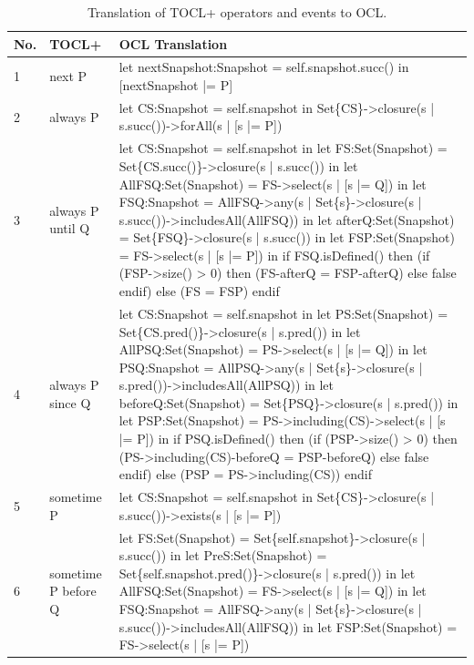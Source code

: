 \begin{longtable}{|>{\footnotesize}p{0.6cm}|>{\scriptsize\raggedright\arraybackslash}p{4cm}|>{\scriptsize\raggedright\arraybackslash}p{\dimexpr\textwidth-4.6cm-4\tabcolsep-3\arrayrulewidth\relax}|}
    \caption{Translation of TOCL+ operators and events to OCL.}
    \label{tab:TOCL2OCL} \\
    \hline
    \textbf{No.} & \textbf{TOCL+} & \textbf{OCL Translation} \\
    \hline
    1 & 
    next P &
    let nextSnapshot:Snapshot = self.snapshot.succ() in [nextSnapshot |= P] \\
    \hline
    2 &
    always P &
    let CS:Snapshot = self.snapshot in Set\{CS\}->closure(s | s.succ())->forAll(s | [s |= P]) \\
    \hline  
    3 &
    always P until Q &
    let CS:Snapshot = self.snapshot
    in let FS:Set(Snapshot) = Set\{CS.succ()\}->closure(s | s.succ())
    in let AllFSQ:Set(Snapshot) = FS->select(s | [s |= Q])
    in let FSQ:Snapshot = AllFSQ->any(s | Set\{s\}->closure(s | s.succ())->includesAll(AllFSQ))
    in let afterQ:Set(Snapshot) = Set\{FSQ\}->closure(s | s.succ())
    in let FSP:Set(Snapshot) = FS->select(s | [s |= P])
    in if FSQ.isDefined() then (if (FSP->size() > 0) then (FS-afterQ = FSP-afterQ) else false endif) else (FS = FSP) endif \\
    \hline
    4 &
    always P since Q &
    let CS:Snapshot = self.snapshot
    in let PS:Set(Snapshot) = Set\{CS.pred()\}->closure(s | s.pred())
    in let AllPSQ:Set(Snapshot) = PS->select(s | [s |= Q])
    in let PSQ:Snapshot = AllPSQ->any(s | Set\{s\}->closure(s | s.pred())->includesAll(AllPSQ))
    in let beforeQ:Set(Snapshot) = Set\{PSQ\}->closure(s | s.pred())
    in let PSP:Set(Snapshot) = PS->including(CS)->select(s | [s |= P])
    in if PSQ.isDefined() then (if (PSP->size() > 0) then (PS->including(CS)-beforeQ = PSP-beforeQ) else false endif) else (PSP = PS->including(CS)) endif \\
    \hline
    5 &
    sometime P &
    let CS:Snapshot = self.snapshot in Set\{CS\}->closure(s | s.succ())->exists(s | [s |= P]) \\
    \hline
    6 &
    sometime P before Q &
    let FS:Set(Snapshot) = Set\{self.snapshot\}->closure(s | s.succ())
    in let PreS:Set(Snapshot) = Set\{self.snapshot.pred()\}->closure(s | s.pred())
    in let AllFSQ:Set(Snapshot) = FS->select(s | [s |= Q])
    in let FSQ:Snapshot = AllFSQ->any(s | Set\{s\}->closure(s | s.succ())->includesAll(AllFSQ))
    in let FSP:Set(Snapshot) = FS->select(s | [s |= P])

\end{longtable}
